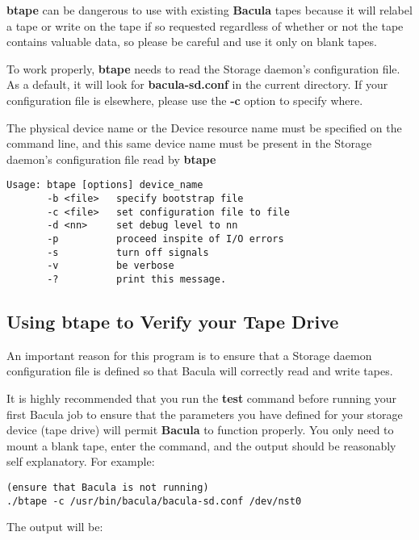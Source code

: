 {\bf btape} can be dangerous to use with existing {\bf Bacula} tapes because
it will relabel a tape or write on the tape if so requested regardless of
whether or not the tape contains valuable data, so please be careful and use
it only on blank tapes. 

To work properly, {\bf btape} needs to read the Storage daemon's configuration
file. As a default, it will look for {\bf bacula-sd.conf} in the current
directory. If your configuration file is elsewhere, please use the {\bf -c}
option to specify where. 

The physical device name or the Device resource name must be specified on the
command line, and this same device name must be present in the Storage
daemon's configuration file read by {\bf btape} 

\footnotesize
\begin{verbatim}
Usage: btape [options] device_name
       -b <file>   specify bootstrap file
       -c <file>   set configuration file to file
       -d <nn>     set debug level to nn
       -p          proceed inspite of I/O errors
       -s          turn off signals
       -v          be verbose
       -?          print this message.
\end{verbatim}
\normalsize

\subsection{Using btape to Verify your Tape Drive}

An important reason for this program is to ensure that a Storage daemon
configuration file is defined so that Bacula will correctly read and write
tapes. 

It is highly recommended that you run the {\bf test} command before running
your first Bacula job to ensure that the parameters you have defined for your
storage device (tape drive) will permit {\bf Bacula} to function properly. You
only need to mount a blank tape, enter the command, and the output should be
reasonably self explanatory. For example: 

\footnotesize
\begin{verbatim}
(ensure that Bacula is not running)
./btape -c /usr/bin/bacula/bacula-sd.conf /dev/nst0
\end{verbatim}
\normalsize

The output will be: 

